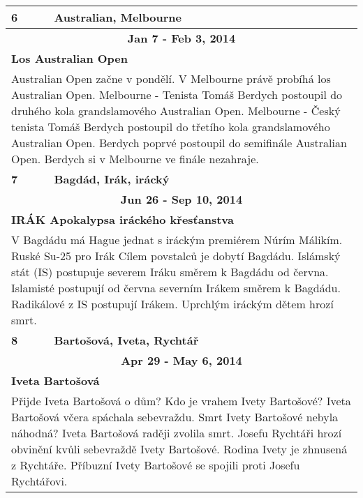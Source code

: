 \begin{tabularx}{\linewidth}{l l}
            \bf 6 & \bf Australian, Melbourne \\ \midrule
            
                \multicolumn{2}{c}{\bf Jan 7 - Feb 3, 2014} \\
                \multicolumn{2}{p{\linewidth}}{\bf Los Australian Open} \\
                \multicolumn{2}{p{\linewidth}}{Australian Open začne v pondělí. V Melbourne právě probíhá los Australian Open. Melbourne - Tenista Tomáš Berdych postoupil do druhého kola grandslamového Australian Open. Melbourne - Český tenista Tomáš Berdych postoupil do třetího kola grandslamového Australian Open. Berdych poprvé postoupil do semifinále Australian Open. Berdych si v Melbourne ve finále nezahraje.} \\ \midrule
                [1.5pt]

            \bf 7 & \bf Bagdád, Irák, irácký \\ \midrule
            
                \multicolumn{2}{c}{\bf Jun 26 - Sep 10, 2014} \\
                \multicolumn{2}{p{\linewidth}}{\bf IRÁK Apokalypsa iráckého křesťanstva} \\
                \multicolumn{2}{p{\linewidth}}{V Bagdádu má Hague jednat s iráckým premiérem Núrím Málikím. Ruské Su-25 pro Irák Cílem povstalců je dobytí Bagdádu. Islámský stát (IS) postupuje severem Iráku směrem k Bagdádu od června. Islamisté postupují od června severním Irákem směrem k Bagdádu. Radikálové z IS postupují Irákem. Uprchlým iráckým dětem hrozí smrt.} \\ \midrule
                [1.5pt]

            \bf 8 & \bf Bartošová, Iveta, Rychtář \\ \midrule
            
                \multicolumn{2}{c}{\bf Apr 29 - May 6, 2014} \\
                \multicolumn{2}{p{\linewidth}}{\bf Iveta Bartošová} \\
                \multicolumn{2}{p{\linewidth}}{Přijde Iveta Bartošová o dům? Kdo je vrahem Ivety Bartošové? Iveta Bartošová včera spáchala sebevraždu. Smrt Ivety Bartošové nebyla náhodná? Iveta Bartošová raději zvolila smrt. Josefu Rychtáři hrozí obvinění kvůli sebevraždě Ivety Bartošové. Rodina Ivety je zhnusená z Rychtáře. Příbuzní Ivety Bartošové se spojili proti Josefu Rychtářovi.} \\ \midrule
                

\end{tabularx}
